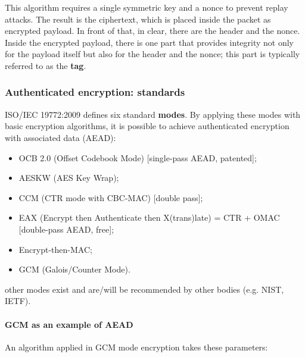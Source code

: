 This algorithm requires a single symmetric key and a nonce to prevent replay attacks. The result is the ciphertext, which is placed inside the packet as encrypted payload. In front of that, in clear, there are the header and the nonce. Inside the encrypted payload, there is one part that provides integrity not only for the payload itself but also for the header and the nonce; this part is typically referred to as the \textbf{tag}.


\subsubsection{Authenticated encryption: standards}
ISO/IEC 19772:2009 defines six standard \textbf{modes}. By applying these modes with basic encryption algorithms, it is possible to achieve authenticated encryption with associated data (AEAD):

\begin{itemize}
    \item OCB 2.0 (Offset Codebook Mode) [single-pass AEAD, patented];
    \item AESKW (AES Key Wrap);
    \item CCM (CTR mode with CBC-MAC) [double pass];
    \item EAX (Encrypt then Authenticate then X(trans)late) = CTR + OMAC [double-pass AEAD, free];
    \item Encrypt-then-MAC;
    \item GCM (Galois/Counter Mode).
\end{itemize}
other modes exist and are/will be recommended by other bodies (e.g. NIST, IETF).


\paragraph{GCM as an example of AEAD}

An algorithm applied in GCM mode encryption takes these parameters:

